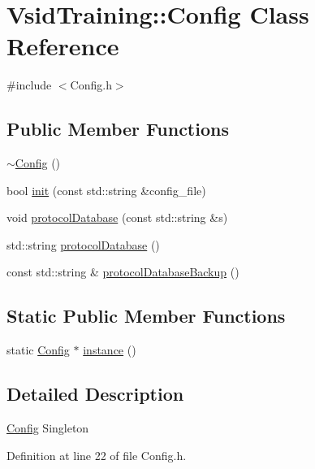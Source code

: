 \hypertarget{class_vsid_training_1_1_config}{\section{Vsid\-Training\-:\-:Config Class Reference}
\label{class_vsid_training_1_1_config}
}


{\ttfamily \#include $<$Config.\-h$>$}

\subsection*{Public Member Functions}
\begin{DoxyCompactItemize}
\item 
\hyperlink{class_vsid_training_1_1_config_a49572f1ec2b823878a8a1c1632ab451e}{$\sim$\-Config} ()
\item 
bool \hyperlink{class_vsid_training_1_1_config_ace4d51e400fb53db0792c2601aca2d74}{init} (const std\-::string \&config\-\_\-file)
\item 
void \hyperlink{class_vsid_training_1_1_config_ad86a1890cfdeb5e8c5bd935be953270d}{protocol\-Database} (const std\-::string \&s)
\item 
std\-::string \hyperlink{class_vsid_training_1_1_config_a918c871857cc73339ca7d19c5efac3cc}{protocol\-Database} ()
\item 
const std\-::string \& \hyperlink{class_vsid_training_1_1_config_af585af38b1835eaaef747879e7d2767f}{protocol\-Database\-Backup} ()
\end{DoxyCompactItemize}
\subsection*{Static Public Member Functions}
\begin{DoxyCompactItemize}
\item 
static \hyperlink{class_vsid_training_1_1_config}{Config} $\ast$ \hyperlink{class_vsid_training_1_1_config_abf1d4539011ef83cac0fef2ac864a3a9}{instance} ()
\end{DoxyCompactItemize}


\subsection{Detailed Description}
\hyperlink{class_vsid_training_1_1_config}{Config} Singleton 

Definition at line 22 of file Config.\-h.



